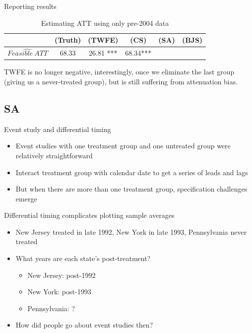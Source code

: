 \documentclass{beamer}
\begin{document}
\begin{frame}{Reporting results}
\begin{table}[htbp]\centering
\small
\caption{Estimating ATT using only pre-2004 data}
\begin{center}
\begin{tabular}{l*{5}{c}}
\hline
\multicolumn{1}{l}{\textbf{}}&
\multicolumn{1}{c}{\textbf{(Truth)}}&
\multicolumn{1}{c}{\textbf{(TWFE)}}&
\multicolumn{1}{c}{\textbf{(CS)}}&
\multicolumn{1}{c}{\textbf{(SA)}}&
\multicolumn{1}{c}{\textbf{(BJS)}}\\
\hline
$\widehat{Feasible\ ATT}$  & 68.33    & 26.81 *** & 68.34*** &&\\
\hline
\end{tabular}
\end{center}
\end{table}

TWFE is no longer negative, interestingly, once we eliminate the last group (giving us a never-treated group), but is still suffering from attenuation bias. 

\end{frame}



\subsection{SA}

\begin{frame}{Event study and differential timing}

\begin{itemize}
\item Event studies with one treatment group and one untreated group were relatively straightforward
\item Interact treatment group with calendar date to get a series of leads and lags
\item But when there are more than one treatment group, specification challenges emerge
\end{itemize}

\end{frame}


\begin{frame}{Differential timing complicates plotting sample averages}

\begin{itemize}
\item New Jersey treated in late 1992, New York in late 1993, Pennsylvania never treated
\item What years are each state's post-treatment?
	\begin{itemize}
	\item New Jersey: post-1992
	\item New York: post-1993
	\item Pennsylvania: ?
	\end{itemize}
\item How did people go about event studies then?

\end{itemize}

\end{frame}
\end{document}
